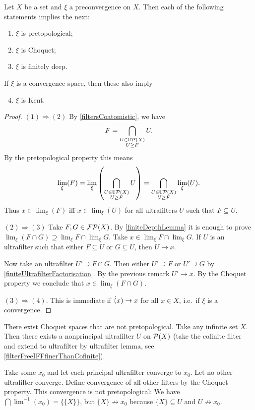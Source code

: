 \begin{proposition} \label{depthImplications}
Let $X$ be a set and $\xi$ a preconvergence on $X$. Then each of the following statements implies the next:
\begin{enumerate}
\item $\xi$ is pretopological;
\item $\xi$ is Choquet;
\item $\xi$ is finitely deep.
\end{enumerate}
If $\xi$ is a convergence space, then these also imply
\begin{enumerate} \setcounter{enumi}{3}
\item $\xi$ is Kent.
\end{enumerate}
\end{proposition}
\begin{proof}
$(1) \Rightarrow (2)$ By \ref{filtersCoatomistic}, we have
\[ F = \bigcap_{\substack{U\in \operatorname{\mathbb{U}\mathcal{P}}(X) \\ U\geq F}} U. \]
By the pretopological property this means
\[ \lim_\xi(F) = \lim_\xi\left(\bigcap_{\substack{U\in \operatorname{\mathbb{U}\mathcal{P}}(X) \\ U\geq F}} U\right) = \bigcap_{\substack{U\in \operatorname{\mathbb{U}\mathcal{P}}(X) \\ U\geq F}} \lim_\xi(U). \]
Thus $x\in \lim_\xi(F)$ iff $x\in \lim_\xi(U)$ for all ultrafilters $U$ such that $F\subseteq U$.

$(2) \Rightarrow (3)$ Take $F,G\in\operatorname{\mathcal{FP}}(X)$. By \ref{finiteDepthLemma} it is enough to prove $\lim_\xi(F\cap G) \supseteq \lim_\xi F \cap \lim_\xi G$. Take $x\in \lim_\xi F \cap \lim_\xi G$. If $U$ is an ultrafilter such that either $F\subseteq U$ or $G\subseteq U$, then $U\to x$.

Now take an ultrafilter $U' \supseteq F\cap G$. Then either $U'\supseteq F$ or $U'\supseteq G$ by \ref{finiteUltrafilterFactorisation}. By the previous remark $U'\to x$. By the Choquet property we conclude that $x\in \lim_\xi(F\cap G)$.

$(3) \Rightarrow (4)$. This is immediate if $\dot(x) \to x$ for all $x\in X$, i.e.\ if $\xi$ is a convergence.
\end{proof}

\begin{example}
There exist Choquet spaces that are not pretopological. Take any infinite set $X$. Then there exists a nonprincipal ultrafilter $U$ on $\operatorname{\mathcal{P}}(X)$ (take the cofinite filter and extend to ultrafilter by ultrafilter lemma, see \ref{filterFreeIFFfinerThanCofinite}).

Take some $x_0$ and let each principal ultrafilter converge to $x_0$. Let no other ultrafilter converge. Define convergence of all other filters by the Choquet property. This convergence is not pretopological: We have $\bigcap \lim^{-1}(x_0) = \big\{\{X\}\big\}$, but $\{X\} \not\to x_0$ because $\{X\}\subseteq U$ and $U \not\to x_0$.
\end{example}


